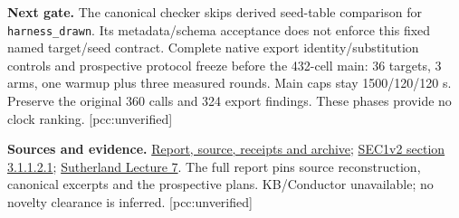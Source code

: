 \documentclass[10pt,a4paper]{article}
\begin{document}
\textbf{Next gate.} The canonical checker skips derived seed-table
comparison for \texttt{harness\_drawn}. Its metadata/schema acceptance does
not enforce this fixed named target/seed contract. Complete native export
identity/substitution controls and prospective protocol freeze before
the 432-cell main: 36 targets, 3 arms, one warmup plus three measured
rounds. Main caps stay 1500/120/120 s. Preserve the original 360 calls
and 324 export findings. These phases provide no clock ranking.
[pcc:unverified]

\textbf{Sources and evidence.}
\href{https://github.com/isogeny-labs/crypto/tree/codex/hashed-ecdl-cohort-validation-20261123/research/hashed_ecdl_cohort_validation_20261123/cohort}{Report, source, receipts and archive};
\href{https://www.secg.org/sec1-v2.pdf}{SEC1v2 section 3.1.1.2.1};
\href{https://math.mit.edu/classes/18.783/2025/LectureNotes7.pdf}{Sutherland Lecture 7}.
The full report pins source reconstruction, canonical excerpts and the
prospective plans. KB/Conductor unavailable; no novelty clearance is
inferred. [pcc:unverified]
\end{document}
